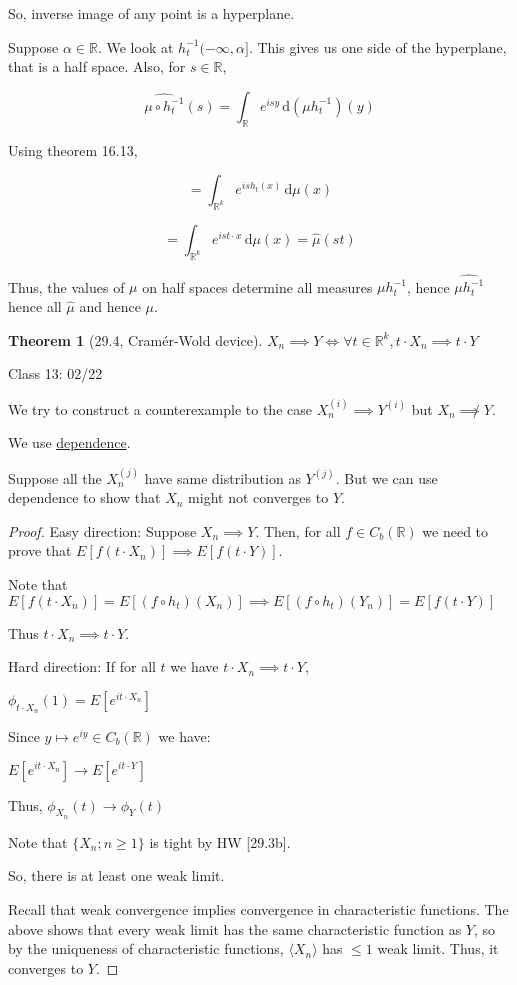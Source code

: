 \documentclass{article}
\theoremstyle{definition}
\newtheorem{theorem}{Theorem}
\begin{document}
So, inverse image of any point is a hyperplane.

Suppose \(\alpha \in \mathbb{R}\). We look at \(h_t ^{-1} (-\infty ,\alpha]\). This gives us one side of the hyperplane, that is a half space. Also, for \(s\in \mathbb{R}\),

\[
    \widehat{\mu\circ h_t^{-1}}(s)=\int_{\mathbb{R}}^{} e^{isy} \,\mathrm{d}(\mu h_t ^{-1}) (y)
\]

Using theorem 16.13,

\[
    = \int_{\mathbb{R}^k}^{} e^{ish_t(x)} \,\mathrm{d}\mu (x)
\]

\[
    = \int_{\mathbb{R}^k}^{} e^{ist\cdot x} \,\mathrm{d}\mu(x) = \hat{\mu} (st)
\]

Thus, the values of \(\mu\) on half spaces determine all measures \(\mu h_t^{-1}\), hence \(\widehat{\mu h_t^{-1}}\) hence all \(\hat{\mu}\) and hence \(\mu\).

\begin{theorem}
    [29.4, Cram\'er-Wold device]

    \(X_n \implies Y \iff \forall t\in \mathbb{R}^k, t\cdot X_n \implies t\cdot Y\) 
\end{theorem}

\hrulefill

Class 13: 02/22

We try to construct a counterexample to the case \(X_n^{(i)} \implies Y^{(i)}\) but \(X_n\not\implies Y\).

We use \underline{dependence}.

Suppose all the \(X_n^{(j)}\) have same distribution as \(Y^{(j)}\). But we can use dependence to show that \(X_n\)  might not converges to \(Y\).

\begin{proof}
    Easy direction: Suppose \(X_n \implies Y\). Then, for all \(f\in C_b(\mathbb{R})\) we need to prove that \(E[f(t\cdot X_n)]\implies E[f(t\cdot Y)]\).
    
    Note that \(E[f(t\cdot X_n)]= E[(f\circ h_t)(X_n)]\implies E[(f\circ h_t)(Y_n)] = E[f(t\cdot Y)]\) 

    Thus \(t\cdot X_n \implies t\cdot Y\).

    Hard direction: If for all \(t\) we have \(t\cdot X_n \implies t\cdot Y\), 

    \(\phi_{t\cdot X_n}(1) = E[e^{it\cdot X_n}]\)
    
    Since \(y \mapsto e^{iy}\in C_b(\mathbb{R})\) we have:

    \(E[e^{it\cdot X_n}] \to E[e^{it\cdot Y}]\) 

    Thus, \(\phi_{X_n}(t) \to \phi_Y (t)\) 

    Note that \(\{ X_n; n\geq 1 \} \) is tight by HW [29.3b].

    So, there is at least one weak limit.

    Recall that weak convergence implies convergence in characteristic functions. The above shows that every weak limit has the same characteristic function as \(Y\), so by the uniqueness of characteristic functions, \(\langle X_n \rangle \) has \(\leq 1\) weak limit. Thus, it converges to \(Y\).
    
\end{proof}
\end{document}
